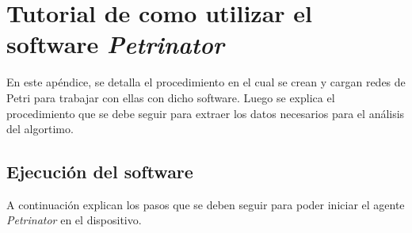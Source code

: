 
\chapter{Tutorial de como utilizar el software \textit{Petrinator}} %

\label{AppendixA} %
En este apéndice, se detalla el procedimiento en el cual se crean y cargan redes de Petri para trabajar con ellas con dicho software.
Luego se explica el procedimiento que se debe seguir para extraer los datos necesarios para el análisis del algortimo.


\section{Ejecución del software}

A continuación explican los pasos que se deben seguir para poder iniciar el agente \textit{Petrinator} en el dispositivo. 

